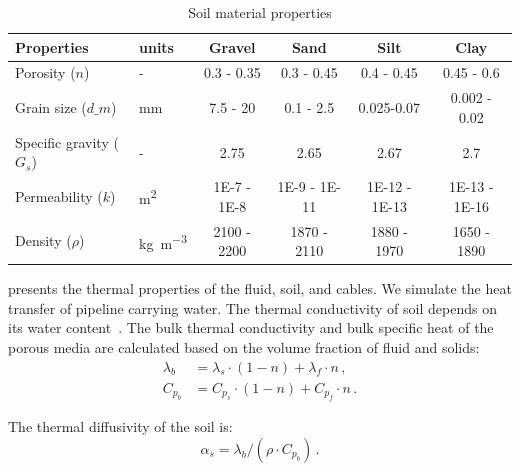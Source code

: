 \documentclass[Journal,letterpaper,InsideFigs]{ascelike-new}
\begin{document}
\begin{table}[!tb]
\caption{Soil material properties}
\label{tab:soil}
\begin{tabular}{llcccc}
\toprule
\textbf{Properties}           &   \textbf{units}                      & \textbf{Gravel} & \textbf{Sand} & \textbf{Silt} & \textbf{Clay} \\
\midrule
Porosity ($n$)                  & -                       & 0.3 - 0.35      & 0.3 - 0.45    & 0.4 - 0.45    & 0.45 - 0.6    \\
Grain size ($d\_m$)             & \si{\milli\meter}                      & 7.5 - 20        & 0.1 - 2.5     & 0.025-0.07    & 0.002 - 0.02  \\
Specific gravity ($G_s$)         & -                       & 2.75            & 2.65          & 2.67          & 2.7           \\
Permeability ($k$)              & \si{\meter\squared}    & 1E-7 - 1E-8     & 1E-9 - 1E-11  & 1E-12 - 1E-13 & 1E-13 - 1E-16 \\
Density ($\rho$) & \si{\kilo\gram\per\meter\cubed} & 2100 - 2200     & 1870 - 2110   & 1880 - 1970   & 1650 - 1890  \\
\bottomrule
\end{tabular}
\end{table}

 presents the thermal properties of the fluid, soil, and cables. We simulate the heat transfer of pipeline carrying water. The thermal conductivity of soil depends on its water content~\cite{young2001utilizing}. The bulk thermal conductivity and bulk specific heat of the porous media are calculated based on the volume fraction of fluid and solids:
\begin{align}
\lambda_b &= \lambda_s \cdot (1 - n) + \lambda_f  \cdot  n\,,\\
C_{p_b} &= C_{p_s}  \cdot (1 - n) + C_{p_f}  \cdot  n\,.
\end{align}

The thermal diffusivity of the soil is:
\begin{equation}
\alpha_s = \lambda_b / (\rho  \cdot  C_{p_b})\,.
\end{equation}
\end{document}

